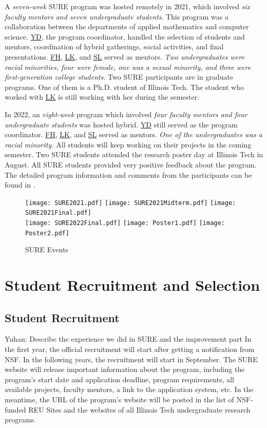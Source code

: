 \documentclass[11pt]{NSFamsart}
\newcommand{\FH}{\hyperlink{FHlink}{FH}\xspace}
\newcommand{\YD}{\hyperlink{YDlink}{YD}\xspace}
\newcommand{\LK}{\hyperlink{LKlink}{LK}\xspace}
\newcommand{\SL}{\hyperlink{SLlink}{SL}\xspace}
\newcommand{\YDNote}[1]{{\color{magenta}Yuhan: #1}}
\begin{document}
A \emph{seven-week} SURE program was hosted remotely in 2021, which involved \emph{six faculty mentors and seven undergraduate students}. This program was a collaboration between the departments of applied mathematics and computer science. \YD, the program coordinator, handled the selection of students and mentors, coordination of hybrid gatherings, social activities, and final presentations. \FH, \LK, and \SL served as mentors. \emph{Two undergraduates were racial minorities, four were female, one was a sexual minority, and three were first-generation college students.} Two SURE participants are in graduate programs. One of them is a Ph.D. student of Illinois Tech. The student who worked with \LK is still working with her during the semester.

In 2022, an \emph{eight-week} program which involved \emph{four faculty mentors and four undergraduate students} was hosted hybrid. \YD still served as the program coordinator. \FH, \LK, and \SL served as mentors. \emph{One of the undergraduates was a racial minority.} All students will keep working on their projects in the coming semester. Two SURE students attended the research poster day at Illinois Tech in August. 
All SURE students provided very positive feedback about the program. The detailed program information and comments from the participants can be found in \cite{SUREWeb}.

\begin{figure}[h]
    \centering
    \texttt{[image: SURE2021.pdf]}
    \texttt{[image: SURE2021Midterm.pdf]}
    \texttt{[image: SURE2021Final.pdf]}\\
    \texttt{[image: SURE2022Final.pdf]}
    \texttt{[image: Poster1.pdf]}
    \texttt{[image: Poster2.pdf]}
    \caption{SURE Events}
    \label{fig:SUREevents}
\end{figure}



\section{Student Recruitment and Selection}

\subsection{Student Recruitment} 


\YDNote{Describe the experience we did in SURE and the improvement part}
 In the first year, the official recruitment will start after getting a notification from NSF.
 In the following years, the recruitment will start in September. The SURE website
 \cite{SUREWeb} will release important information about the program, including the program's start date and application deadline, program requirements,  all available projects, faculty mentors, a link to the application system, etc. In the meantime, the URL of the program’s
website \cite{SUREWeb} will be posted in the list of NSF-funded REU Sites and the websites of all Illinois Tech undergraduate research programs.
\end{document}
